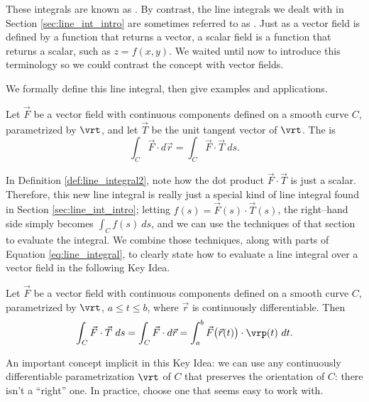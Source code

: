 These integrals are known as . By contrast, the line integrals we dealt with in Section \ref{sec:line_int_intro} are sometimes referred to as . Just as a vector field is defined by a function that returns a vector, a scalar field is a function that returns a scalar, such as $z = f(x,y)$. We waited until now to introduce this terminology so we could contrast the concept with vector fields. 

We formally define this line integral, then give examples and applications.

{Let $\vec F$ be a vector field with continuous components defined on a smooth curve $C$, parametrized by $\vrt$, and let $\vec T$ be the unit tangent vector of $\vrt$. The  is
$$\int_C \vec F\cdot d\vec r = \int_C \vec F\cdot\vec T\ ds.$$
}

In Definition \ref{def:line_integral2}, note how the dot product $\vec F \cdot \vec T$ is just a scalar. %
Therefore, this new line integral is really just a special kind of line integral found in Section \ref{sec:line_int_intro}; letting $f(s) = \vec F(s)\cdot \vec T(s)$, the right--hand side simply becomes $\int_C f(s)\ ds$, and we can use the techniques of that section to evaluate the integral. We combine those techniques, along with parts of Equation \eqref{eq:line_integral}, to clearly state how to evaluate a line integral over a vector field in the following Key Idea. 

{Let $\vec F$ be a vector field with continuous components defined on a smooth curve $C$, parametrized by $\vrt$, $a\leq t\leq b$, where $\vec r$ is continuously differentiable. Then
	$$\int_C\vec F\cdot\vec T\ ds = \int_C \vec F\cdot d\vec r =\int_a^b \vec F\big(\vec r(t)\big) \cdot \vrp(t)\ dt.$$
}

An important concept implicit in this Key Idea: we can use any continuously differentiable parametrization $\vrt$ of $C$ that preserves the orientation of $C$: there isn't a ``right'' one. In practice, choose one that seems easy to work with. 

